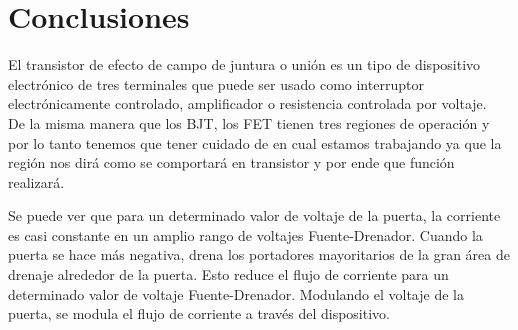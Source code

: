 \documentclass{mylib/reporteConCalif}
\begin{document}
\section{Conclusiones}

El transistor de efecto de campo de juntura o unión es un tipo de dispositivo electrónico de tres terminales que puede ser usado como interruptor electrónicamente controlado, amplificador o resistencia controlada por voltaje.\\

De la misma manera que los BJT, los FET tienen tres regiones de operación y por lo tanto tenemos que tener cuidado de en cual estamos trabajando ya que la región nos dirá como se comportará en transistor y por ende que función realizará.


Se puede ver que para un determinado valor de voltaje de la puerta, la corriente es casi constante en un amplio rango de voltajes Fuente-Drenador. Cuando la puerta se hace más negativa, drena los portadores mayoritarios de la gran área de drenaje alrededor de la puerta. Esto reduce el flujo de corriente para un determinado valor de voltaje Fuente-Drenador. Modulando el voltaje de la puerta, se modula el flujo de corriente a través del dispositivo.
\end{document}
